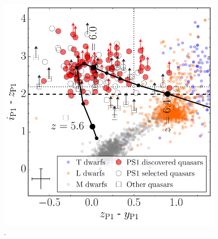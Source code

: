 \documentclass[11pt,a4paper]{article}
\begin{document}
    \begin{figure}
      \centering
      \includegraphics[width=16.0cm,  trim={0.0cm 0 0 0},clip, angle=0]{f1_ps1_color_selection.pdf}
      \caption[]{\citet{Banados2016}.} 
      \label{fig:Banados2016}
    \end{figure}
\end{document}
